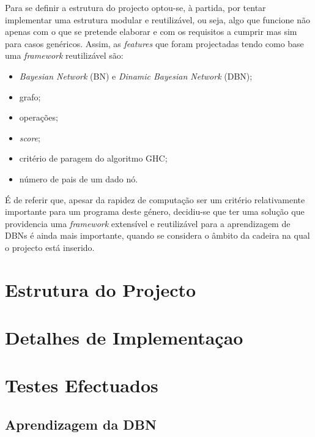 \documentclass[10pt]{article}
\numberwithin{equation}{section}
\begin{document}
Para se definir a estrutura do projecto optou-se, à partida, por tentar implementar uma estrutura modular e reutilizável, ou seja, algo que funcione não apenas com o que se pretende elaborar e com os requisitos a cumprir mas sim para casos genéricos. Assim, as \textit{features} que foram projectadas tendo como base uma \textit{framework} reutilizável são:

\begin{itemize}
	\item \textit{Bayesian Network} (BN) e \textit{Dinamic Bayesian Network} (DBN);
	\vspace{-2.5mm}
	\item grafo;
	\vspace{-2.5mm}
	\item operações; 
	\vspace{-2.5mm}
	\item \textit{score};
	\vspace{-2.5mm}
	\item critério de paragem do algoritmo GHC;
	\vspace{-2.5mm}
	\item número de pais de um dado nó.
\end{itemize}

É de referir que, apesar da rapidez de computação ser um critério relativamente importante para um programa deste género, decidiu-se que ter uma solução que providencia uma \textit{framework} extensível e reutilizável para a aprendizagem de DBNs é ainda mais importante, quando se considera o âmbito da cadeira na qual o projecto está inserido.

\section{Estrutura do Projecto}


\section{Detalhes de Implementaçao}


\section{Testes Efectuados}

\subsection{Aprendizagem da DBN}
\end{document}
